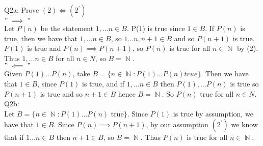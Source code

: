 \documentclass[letterpaper]{article}
\DeclareMathOperator{\N}{\mathbb{N}}
\begin{document}
\noindent Q2a: Prove $(2)\iff (2^\prime)$ \\ $"\implies"$ \\
Let $P(n)$ be the statement $1,\dots n \in  B$. P(1) is true since $1 \in B$. If $P(n)$ is true, then we have that $1,\dots n \in B$, so $1\dots n,n+1 \in B$ and so $P(n+1)$ is true. $P(1)$ is true and $P(n)\implies P(n+1)$, so $P(n)$ is true for all $n\in \N$ by (2). Thus $1,\dots n \in B$ for all $n\in N$, so $B = \N$. 
\\ $"\impliedby"$\\ Given $P(1) \dots P(n)$, take $B= \{ n\in \N : P(1) \dots P(n) true \}$. Then we have that $1\in B$, since $P(1)$ is true, and if $1,\dots n \in B$ then $P(1),\dots P(n)$ is true so $P(n+1)$ is true and so $n+1\in B$ hence $B=\N$. So $P(n)$ true for all $n\in N$. 
\\ Q2b: \\ Let $B= \{ n\in \N: P(1)\dots P(n)\text{ true} \}$. Since $P(1)$ is true by assumption, we have that $1\in B$. Since $P(n)\implies P(n+1)$, by our assumption $(2^\prime)$ we know that if $1\dots n\in B$ then $n+1\in B$, so $B=\N$. Thus $P(n)$ is true for all $n\in \N$.
\end{document}
